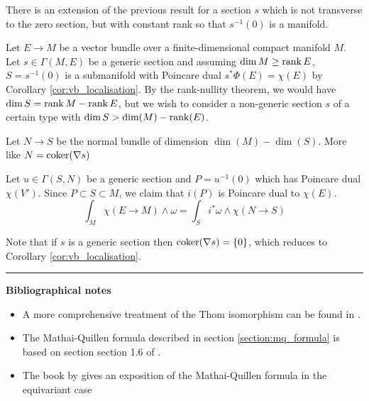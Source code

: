 There is an extension of the previous result for a section $s$ which is not
transverse to the zero section, but with constant rank so that $s^{-1}(0)$ is a
manifold. 

Let $E\to M$ be a vector bundle over a finite-dimensional compact manifold  $M$.
Let $s\in\Gamma(M,E)$ be a generic section and assuming $\dim M \geq \operatorname{rank} E$, 
$S=s^{-1}(0)$ is a submanifold with
Poincare dual $s^*\Phi(E)=\chi(E)$ by Corollary \ref{cor:vb_localisation}. 
By the rank-nullity theorem, we would have $\dim S = \operatorname{rank} M - \operatorname{rank} E$, but 
we wish to consider a non-generic section $s$ of a certain type with 
$\dim S > \dim(M)-\operatorname{rank}(E)$. 

\begin{thm}
	Let  $N\to S$ be the normal bundle of dimension
	$\dim(M)-\dim(S)$.  More like $N = \operatorname{coker} (\nabla s)$

	Let  $u\in\Gamma(S,N)$ be a generic section and
	$P=u^{-1}(0)$ which has Poincare dual $\chi(V')$. Since  $P\subset S \subset M$,
	we claim that $i(P)$ is Poincare dual to  $\chi(E)$.
\[
\int_M \chi(E\to M)\wedge \omega = \int_{S} i^*\omega \wedge \chi(N\to S)
\]
\end{thm}

 
Note that if $s$ is a generic section then  $\operatorname{coker} (\nabla s) = \{0\}$, which
reduces to Corollary \ref{cor:vb_localisation}.




\vspace{5mm}
\hrule 
\vspace{5mm}

\textbf{Bibliographical notes}
{\small
\begin{itemize}
	\item A more comprehensive treatment of the Thom isomorphism can be found in
		\citet{bott_tu}.  
	\item The Mathai-Quillen formula described in section
		\ref{section:mq_formula} is based on section 
		section 1.6 of \cite{bgv}.
	\item The book by \citet{guillemin} gives an exposition of the
	Mathai-Quillen formula in the equivariant case 
\end{itemize}
}
